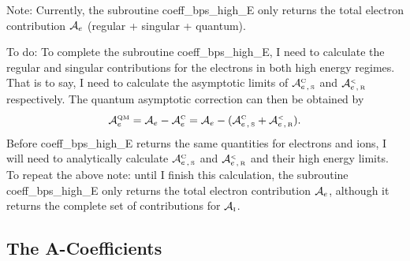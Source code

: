 \documentclass[preprint,12pt,eqsecnum,nofootinbib,amsmath,amssymb]{revtex4}
\newcommand{\smC}{{\rm\scriptscriptstyle C}}
\newcommand{\smI}{{\rm\scriptscriptstyle I}}
\newcommand{\smR}{{\rm\scriptscriptstyle R}}
\newcommand{\smS}{{\rm\scriptscriptstyle S}}
\newcommand{\smQM}{{\rm\scriptscriptstyle QM}}
\newcommand{\smLT}{{\rm\scriptscriptstyle <}}
\begin{document}
\vskip0.5cm
\noindent
Note: Currently, the subroutine coeff\_bps\_high\_E only returns the
total electron contribution ${\cal A}_e$ (regular + singular + quantum).



\vskip0.5cm
\noindent
To do: To complete the subroutine coeff\_bps\_high\_E, I need to
calculate the regular and singular contributions for the electrons in
both high energy regimes. That is to say, I need to calculate the
asymptotic limits of ${\cal A}_{e \,,\,\smS}^\smC$ and ${\cal A}_{e
\,,\,\smR}^\smLT$ respectively. The quantum asymptotic correction
can then be obtained by
  $$
  {\cal A}_e^\smQM = {\cal A}_e - {\cal A}_e^\smC = 
  {\cal A}_e - ({\cal A}_{e\,,\,\smS}^\smC + {\cal A}_{e
  \,,\,\smR}^\smLT ).
  $$ 
Before coeff\_bps\_high\_E returns the same quantities for electrons
and ions, I will need to analytically calculate ${\cal A}_{e \, ,
\,\smS}^\smC$ and ${\cal A}_{e \,, \, \smR}^\smLT$ and their high
energy limits. To repeat the above note: until I finish this
calculation, the subroutine coeff\_bps\_high\_E only returns the total
electron contribution ${\cal A}_e$, although it returns the complete
set of contributions for ${\cal A}_\smI$. 

\subsection{The {\cal A}-Coefficients}
\end{document}
